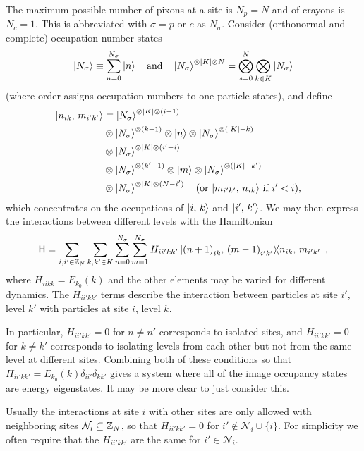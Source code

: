 \documentclass[../notebook.tex]{subfiles}
\begin{document}
\begin{defn}
  The maximum possible number of pixons at a site is $N_p = N$ and of crayons is
  $N_c = 1$. This is abbreviated with $\sigma = p$ or $c$ as $N_\sigma$.
  Consider (orthonormal and complete) occupation number states
  \[
    \ket{N_\sigma}
    \equiv \sum_{n=0}^{N_\sigma} \ket{n}
    \qand
    \ket{N_\sigma}^{\otimes\abs{K}\otimes N}
    = \bigotimes_{s = 0}^N \bigotimes_{k \in K} \ket{N_\sigma}
  \]
  (where order assigns occupation numbers to one-particle states), and define
  \begin{align}
    \ket{n_{ik},\, m_{i'k'}}
    &\equiv \ket{N_\sigma}^{\otimes\abs{K}\otimes(i-1)} \\
    &\otimes \ket{N_\sigma}^{\otimes(k - 1)}
    \otimes \ket{n}
    \otimes \ket{N_\sigma}^{\otimes(\abs{K} - k)} \\
    &\otimes \ket{N_\sigma}^{\otimes\abs{K}\otimes(i'-i)} \\
    &\otimes \ket{N_\sigma}^{\otimes(k' - 1)}
    \otimes \ket{m}
    \otimes \ket{N_\sigma}^{\otimes(\abs{K} - k')} \\
    &\otimes \ket{N_\sigma}^{\otimes\abs{K}\otimes(N-i')}
    \qq{(or $\ket{m_{i'k'},\, n_{ik}}$ if $i' < i$),}
  \end{align}
  which concentrates on the occupations of $\ket{i,\,k}$ and $\ket{i',\, k'}$.
  We may then express the interactions between different levels with the
  Hamiltonian
  \[
    \mathsf{H}
    = \sum_{i,i' \in \mathbb{Z}_N} \sum_{k,k' \in K}
    \sum_{n=0}^{N_\sigma} \sum_{m=1}^{N_\sigma}
    H_{ii'kk'}\op{{(n+1)}_{ik},\, {(m-1)}_{i'k'}}{n_{ik},\, m_{i'k'}},
  \]
where $H_{iikk} = E_{k_0}(k)$ and the other elements may be varied for different
dynamics. The $H_{ii'kk'}$ terms describe the interaction between particles at
site $i'$, level $k'$ with particles at site $i$, level $k$.
\end{defn}

In particular, $H_{ii'kk'} = 0$ for $n \ne n'$ corresponds to isolated sites,
and $H_{ii'kk'} = 0$ for $k \ne k'$ corresponds to isolating levels from each
other but not from the same level at different sites. Combining both of these
conditions so that $H_{ii'kk'} = E_{k_0}(k)\delta_{ii'}\delta_{kk'}$ gives a
system where all of the image occupancy states are energy eigenstates. It may be
more clear to just consider this.

Usually the interactions at site $i$ with other sites are only allowed with
neighboring sites $\mathcal{N}_i \subseteq \mathbb{Z}_N$, so that $H_{ii'kk'} = 0$ for
$i' \notin \mathcal{N}_i \cup \{i\}$. For simplicity we often require that the
$H_{ii'kk'}$ are the same for $i' \in \mathcal{N}_i$.
\end{document}
